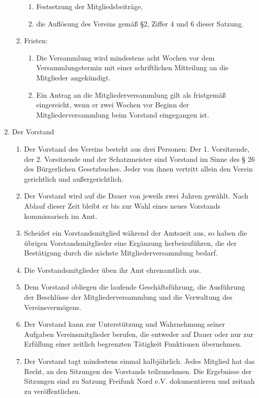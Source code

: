 \documentclass[12pt,a4paper]{article}
\newcommand{\Verein}{Freifunk Nord } %
\begin{document}
\begin{enumerate}
\begin{enumerate}
\begin{enumerate}
\item Festsetzung der Mitgliedsbeiträge, 
\item die Auflösung des Vereins gemäß §2, Ziffer 4 und 6 dieser Satzung. 
\end{enumerate}
\item Fristen: 
\begin{enumerate}
\item Die Versammlung wird mindestens acht Wochen vor dem Versammlungstermin mit einer schriftlichen Mitteilung an die Mitglieder angekündigt.
\item Ein Antrag an die Mitgliederversammlung gilt als fristgemäß eingereicht, wenn er zwei Wochen vor Beginn der Mitgliederversammlung beim Vorstand eingegangen ist.
\end{enumerate}
\end{enumerate}
\item Der Vorstand
\begin{enumerate}
\item Der Vorstand des Vereins besteht aus drei Personen: Der 1. Vorsitzende, der 2. Vorsitzende und der Schatzmeister sind Vorstand im Sinne des § 26 des Bürgerlichen Gesetzbuches. Jeder von ihnen vertritt allein den Verein gerichtlich und außergerichtlich.
\item Der Vorstand wird auf die Dauer von jeweils zwei Jahren gewählt. Nach Ablauf dieser Zeit bleibt er bis zur Wahl eines neues Vorstands kommissarisch im Amt.
\item Scheidet ein Vorstandsmitglied während der Amtszeit aus, so haben die übrigen Vorstandsmitglieder eine Ergänzung herbeizuführen, die der Bestätigung durch die nächste Mitgliederversammlung bedarf.
\item Die Vorstandsmitglieder üben ihr Amt ehrenamtlich aus.
\item Dem Vorstand obliegen die laufende Geschäftsführung, die Ausführung der Beschlüsse der Mitgliederversammlung und die Verwaltung des Vereinsvermögens.
\item Der Vorstand kann zur Unterstützung und Wahrnehmung seiner Aufgaben Vereinsmitglieder berufen, die entweder auf Dauer oder nur zur Erfüllung einer zeitlich begrenzten Tätigkeit Funktionen übernehmen.
\item Der Vorstand tagt mindestens einmal halbjährlich. Jedes Mitglied hat das Recht, an den Sitzungen des Vorstands teilzunehmen. Die Ergebnisse der Sitzungen sind zu Satzung \Verein e.V. dokumentieren und zeitnah zu veröffentlichen.
\end{enumerate}
\end{enumerate}
\end{document}
